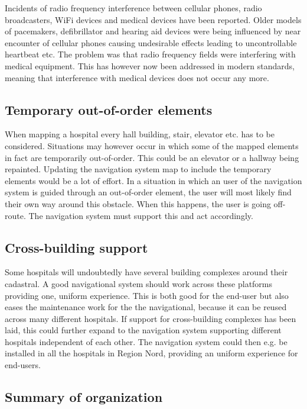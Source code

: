 Incidents of radio frequency interference between cellular phones, radio broadcasters, WiFi devices and medical devices have been reported. Older models of pacemakers, defibrillator and hearing aid devices were being influenced by near encounter of cellular phones causing undesirable effects leading to uncontrollable heartbeat etc. 
The problem was that radio frequency fields were interfering with medical equipment. This has however now been addressed in modern standards, meaning that interference with medical devices does not occur any more. \cite{Man1998,Case}

\subsection{Temporary out-of-order elements}

When mapping a hospital every hall building, stair, elevator etc. has to be considered. Situations may however occur in which some of the mapped elements in fact are temporarily out-of-order. This could be an elevator or a hallway being repainted. Updating the navigation system map to include the temporary elements would be a lot of effort. In a situation in which an user of the navigation system is guided through an out-of-order element, the user will most likely find their own way around this obstacle. When this happens, the user is going off-route. The navigation system must support this and act accordingly.

\subsection{Cross-building support}

Some hospitals will undoubtedly have several building complexes around their cadastral. A good navigational system should work across these platforms providing one, uniform experience. This is both good for the end-user but also eases the maintenance work for the the navigational, because it can be reused across many different hospitals. If support for cross-building complexes has been laid, this could further expand to the navigation system supporting different hospitals independent of each other. The navigation system could then e.g. be installed in all the hospitals in Region Nord, providing an uniform experience for end-users.

\subsection{Summary of organization}


